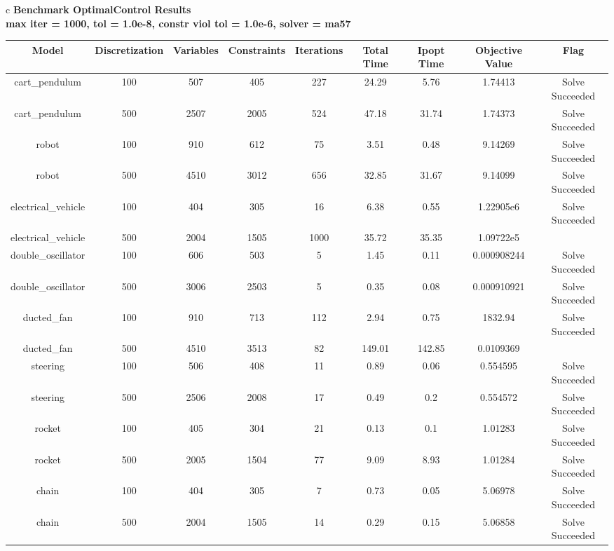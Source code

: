 \documentclass{standalone}
\begin{document}
\begin{tabular}{c}
\Large\textbf{Benchmark OptimalControl Results}\\
\large\textbf{max iter = 1000, tol = 1.0e-8, constr viol tol = 1.0e-6, solver = ma57}\\
\begin{tabular}{ccccccccc}
  \hline
  \textbf{Model} & \textbf{Discretization} & \textbf{Variables} & \textbf{Constraints} & \textbf{Iterations} & \textbf{Total Time} & \textbf{Ipopt Time} & \textbf{Objective Value} & \textbf{Flag} \\\hline
  cart\_pendulum & 100 & 507 & 405 & 227 & 24.29 & 5.76 & 1.74413 & Solve Succeeded \\
  cart\_pendulum & 500 & 2507 & 2005 & 524 & 47.18 & 31.74 & 1.74373 & Solve Succeeded \\
  robot & 100 & 910 & 612 & 75 & 3.51 & 0.48 & 9.14269 & Solve Succeeded \\
  robot & 500 & 4510 & 3012 & 656 & 32.85 & 31.67 & 9.14099 & Solve Succeeded \\
  electrical\_vehicle & 100 & 404 & 305 & 16 & 6.38 & 0.55 & 1.22905e6 & Solve Succeeded \\
  electrical\_vehicle & 500 & 2004 & 1505 & 1000 & 35.72 & 35.35 & 1.09722e5 & \color{red}{Iterations Exceeded} \\
  double\_oscillator & 100 & 606 & 503 & 5 & 1.45 & 0.11 & 0.000908244 & Solve Succeeded \\
  double\_oscillator & 500 & 3006 & 2503 & 5 & 0.35 & 0.08 & 0.000910921 & Solve Succeeded \\
  ducted\_fan & 100 & 910 & 713 & 112 & 2.94 & 0.75 & 1832.94 & Solve Succeeded \\
  ducted\_fan & 500 & 4510 & 3513 & 82 & 149.01 & 142.85 & 0.0109369 & \color{red}{Infeasible Problem} \\
  steering & 100 & 506 & 408 & 11 & 0.89 & 0.06 & 0.554595 & Solve Succeeded \\
  steering & 500 & 2506 & 2008 & 17 & 0.49 & 0.2 & 0.554572 & Solve Succeeded \\
  rocket & 100 & 405 & 304 & 21 & 0.13 & 0.1 & 1.01283 & Solve Succeeded \\
  rocket & 500 & 2005 & 1504 & 77 & 9.09 & 8.93 & 1.01284 & Solve Succeeded \\
  chain & 100 & 404 & 305 & 7 & 0.73 & 0.05 & 5.06978 & Solve Succeeded \\
  chain & 500 & 2004 & 1505 & 14 & 0.29 & 0.15 & 5.06858 & Solve Succeeded \\

\end{tabular}
\end{tabular}
\end{document}
